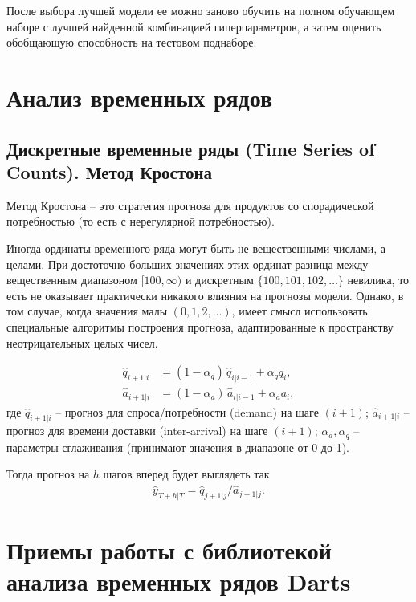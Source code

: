 \documentclass[%
	11pt,
	a4paper,
	utf8,
		]{article}
\begin{document}
После выбора лучшей модели ее можно заново обучить на полном обучающем наборе с лучшей найденной комбинацией гиперпараметров, а затем оценить обобщающую способность на тестовом поднаборе.

\section{Анализ временных рядов}

\subsection{Дискретные временные ряды (Time Series of Counts). Метод Кростона}

Метод Кростона -- это стратегия прогноза для продуктов со спорадической потребностью (то есть с нерегулярной потребностью).

Иногда ординаты временного ряда могут быть не вещественными числами, а целами. При достоточно больших значениях этих ординат разница между вещественным диапазоном $ [100, \infty) $ и дискретным $ \{100, 101, 102, \ldots \} $ невилика, то есть не оказывает практически никакого влияния на прогнозы модели. Однако, в том случае, когда значения малы $ (0, 1, 2, \ldots) $, имеет смысл использовать специальные алгоритмы построения прогноза, адаптированные к пространству неотрицательных целых чисел.

\begin{align*}
	\hat{q}_{i + 1 | i} &= (1 - \alpha_q) \, \hat{q}_{ i | i - 1 } + \alpha_q q_i, \\
	\hat{a}_{i + 1 | i} &= (1 - \alpha_a) \, \hat{a}_{ i | i - 1 } + \alpha_a a_i,
\end{align*}
где $ \hat{q}_{i + 1 | i} $ -- прогноз для спроса/потребности (demand) на шаге $ (i + 1) $; $ \hat{a}_{i + 1 | i} $ -- прогноз для времени доставки (inter-arrival) на шаге $ (i + 1) $; $ \alpha_a, \alpha_q $ -- параметры сглаживания (принимают значения в диапазоне от 0 до 1).

Тогда прогноз на $ h $ шагов вперед будет выглядеть так
\begin{align*}
	\hat{y}_{T + h | T} = \hat{q}_{j + 1 | j} / \hat{a}_{j + 1 | j}.
\end{align*}





\section{Приемы работы с библиотекой анализа временных рядов Darts}
\end{document}
